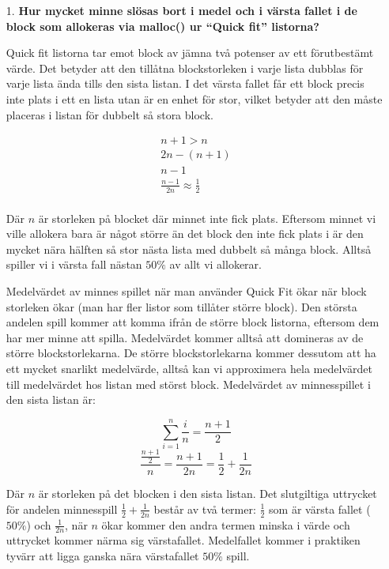 \documentclass[a4paper,10pt,titlepage]{article}
\begin{document}
\begin{enumerate}
\item[1.] \textbf{\footnotesize Hur mycket minne slösas bort i medel och i värsta fallet i de block som allokeras via malloc() ur ``Quick fit'' listorna?}

Quick fit listorna tar emot block av jämna två potenser av ett
förutbestämt värde. Det betyder att den tillåtna blockstorleken i
varje lista dubblas för varje lista ända tills den sista listan. I
det värsta fallet får ett block precis inte plats i ett en lista utan är en
enhet för stor, vilket betyder att den måste placeras i listan för dubbelt så
stora block.

\begin{equation*}
\begin{array}{c}
n+1 > n\\
2n - (n+1)\\
n-1\\
\frac{n-1}{2n} \approx \frac{1}{2}\\
\end{array}
\end{equation*}

Där $n$ är storleken på blocket där minnet inte fick plats.
Eftersom minnet vi ville allokera bara är något större än det block den inte
fick plats i är den mycket nära hälften så stor nästa lista med dubbelt så många
block. Alltså spiller vi i värsta fall nästan $50\%$ av allt vi allokerar.

Medelvärdet av minnes spillet när man använder Quick Fit ökar när block
storleken ökar (man har fler listor som tillåter större block). Den största
andelen spill kommer att komma ifrån de större block listorna, eftersom dem har
mer minne att spilla. Medelvärdet kommer alltså att domineras av de större
blockstorlekarna. De större blockstorlekarna kommer dessutom att ha ett mycket
snarlikt medelvärde, alltså kan vi approximera hela medelvärdet till medelvärdet
hos listan med störst block. Medelvärdet av minnesspillet i den sista listan är:

\begin{equation*}
\sum^n_{i=1}\frac{i}{n} = \frac{n + 1}{2}
\end{equation*}
\begin{equation*}
\frac{\frac{n + 1}{2}}{n} = \frac{n+1}{2n} = \frac{1}{2} + \frac{1}{2n}
\end{equation*}

Där $n$ är storleken på det blocken i den sista listan. Det slutgiltiga uttrycket
för andelen minnesspill $\frac{1}{2} + \frac{1}{2n}$ består av två
termer: $\frac{1}{2}$ som är värsta fallet ($50\%$) och $\frac{1}{2n}$, när $n$
ökar kommer den andra termen minska i värde och uttrycket kommer närma sig värstafallet. 
Medelfallet kommer i praktiken tyvärr att ligga ganska nära värstafallet $50\%$ spill.

\end{enumerate}
\end{document}
